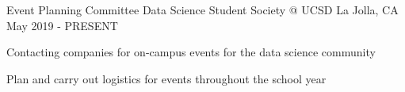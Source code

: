 
\begin{cventries}
  \cventry
    {Event Planning Committee} %
    {Data Science Student Society @ UCSD} %
    {La Jolla, CA} %
    {May 2019 - PRESENT} %
    {
      \begin{cvitems} %
        \item {Contacting companies for on-campus events for the data science community}
        \item {Plan and carry out logistics for events throughout the school year}
      \end{cvitems}
    }
\end{cventries}

